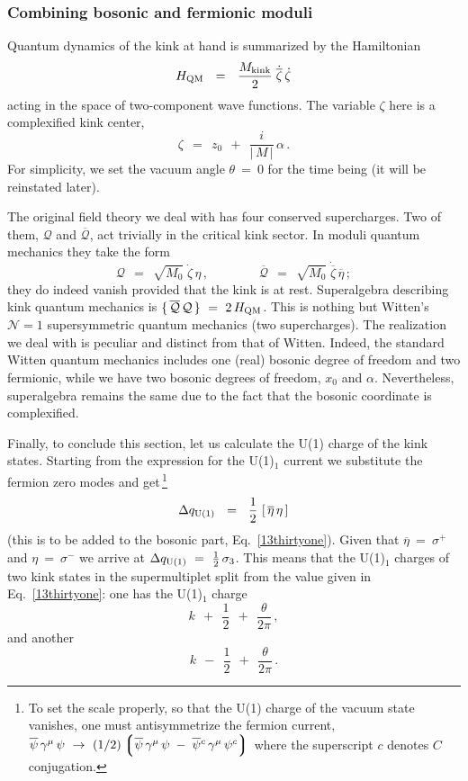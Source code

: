\documentclass[epsfig,12pt]{article}
\def\beq{\begin{equation}}
\def\eeq{\end{equation}}
\def\beq{\begin{equation}}
\def\eeq{\end{equation}}
\newcommand{\ov}{\overline}
\newcommand{\lgr}{\left\lgroup}
\newcommand{\rgr}{\right\rgroup}
\newcommand{\bpsi}{\ov{\psi}{}}
\begin{document}
\subsubsection{Combining bosonic and fermionic moduli}
\label{cbfm}

	Quantum dynamics of the kink at hand is summarized by the
	Hamiltonian
\beq
	H_{\rm QM}  ~~=~~  \frac{M_{\rm kink}}{2}\;\dot{\ov{\zeta}}\, \dot\zeta
\label{13fourtynine}
\eeq
	acting in the space of two-component wave functions.
	The variable $ \zeta $ here is a complexified kink center,
\beq
	\zeta  ~~=~~  z_0  ~~+~~  \frac{i}{|\, M \,|}\, \alpha\,.
\label{13fifty}
\eeq
	For simplicity, we set the vacuum angle $ \theta ~=~0 $ for the time being
	(it will be reinstated later). 

	The original field theory we deal with has four conserved supercharges.
	Two of them, $ {\mathcal Q} $ and $ \ov{\mathcal Q} $, 
	act trivially in the critical kink sector. In moduli quantum
	mechanics they take the form
\beq
	{\mathcal Q}  ~~=~~  \sqrt{ M_0 }\; \dot\zeta\, \eta\,,
	\qquad\qquad
	\ov{\mathcal Q}  ~~=~~  \sqrt{ M_0 }\; \dot{\ov{\zeta}}\, \ov{\eta} \, ;
\label{13fiftyone}
\eeq
	they do indeed vanish provided that the kink is at rest.
	Superalgebra describing kink quantum mechanics is
	$ \{\,  \ov{\mathcal Q}\, {\mathcal Q} \,\} ~=~ 2\, H_{\rm QM} $. 
	This is nothing but Witten's ${\mathcal N} = 1$
	supersymmetric quantum mechanics  (two supercharges).
	The realization we deal with is peculiar and distinct from 
	that of Witten. Indeed, the standard Witten quantum mechanics
	includes one (real) bosonic degree of freedom and two fermionic, while
	we have two bosonic degrees of freedom,
	$ x_0 $ and $ \alpha $. Nevertheless, superalgebra remains the same
	due to the fact that the bosonic coordinate is complexified.
	 
	Finally, to conclude this section, let us calculate the U(1) charge
	of the kink states. Starting from the expression  for the U(1)$_1$ current we
	substitute the fermion zero modes and get\,\footnote{To set the scale properly, so that
	the U(1) charge of the vacuum state vanishes, one must
	antisymmetrize
	the fermion current, 
	$ \bpsi\, \gamma^\mu\, \psi ~\to~ (1/2) \lgr \bpsi\, \gamma^\mu\, \psi \;-\; \bpsi{}^c\, \gamma^\mu\, \psi^c \rgr $ 
	where the superscript $c$ denotes $C$ conjugation.}
\beq
	\Delta q_{\rm U(1)}  ~~=~~  \frac{1}{2}\, \left[\, \ov{\eta}\, \eta \,\right]
\label{13fiftytwo}
\eeq
	(this is to be added to the bosonic part, Eq.~\eqref{13thirtyone}).
	Given that $ \ov{\eta} ~=~ \sigma^+ $ and $ \eta ~=~ \sigma^- $ we arrive at
	$ \Delta q_{\rm U(1)} ~=~ \frac{1}{2}\, \sigma_3 $. 
	This means that the U(1)$_1$ charges of two kink states in the supermultiplet
	split from the value given in Eq.~\eqref{13thirtyone}:
	one has the U(1)$_1$ charge
$$
	k  ~~+~~  \frac{1}{2}  ~~+~~  \frac{\theta}{2\pi}\,,
$$
and another
$$
	k  ~~-~~  \frac{1}{2} ~~+~~  \frac{\theta}{2\pi}\,.
$$
\end{document}
